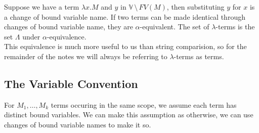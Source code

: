 Suppose we have a term $\lambda x.M$ and $y$ in $\mathbb{V} \, \setminus \, FV(M)$,
then substituting $y$ for $x$ is a change of bound variable name. If two terms
can be made identical through changes of bound variable name, they are
$\alpha$-equivalent. The set of $\lambda$-terms is the set $\Lambda$ under
$\alpha$-equivalence.
\\[\baselineskip]
This equivalence is much more useful to us than string comparision, so for the
remainder of the notes we will always be referring to $\lambda$-terms as terms.

\subsection{The Variable Convention}

For $M_1, \ldots, M_k$ terms occuring in the same scope, we assume each term
has distinct bound variables. We can make this assumption as otherwise, we
can use changes of bound variable names to make it so.
